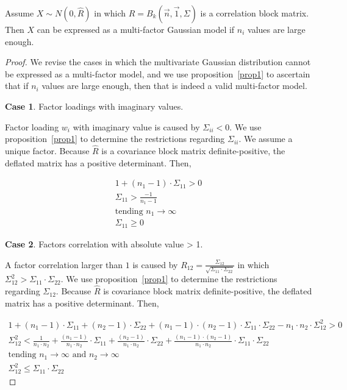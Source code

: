 \documentclass[11pt,fleqn]{book} %
\begin{document}
\begin{proposition}
	\label{prop:gmfamgb}
	Assume $X \sim N(0,\widehat{R})$ in which 
	$\widehat{R}=B_k(\vec{n},\vec{1},\Sigma)$ is a correlation block matrix. 
	Then $X$ can be expressed as a multi-factor Gaussian model if $n_i$ 
	values are large enough.
\end{proposition}
\begin{proof}
	We revise the cases in which the multivariate Gaussian distribution cannot
	be expressed as a multi-factor model, and we use proposition~\ref{prop1}
	to ascertain that if $n_i$ values are large enough, then 
	that is indeed a valid multi-factor model.
	
	\textbf{Case 1}. Factor loadings with imaginary values.
	\begin{adjustwidth}{1cm}{0pt}
		Factor loading $w_i$ with imaginary value is caused by $\Sigma_{ii} < 0$. 
		We use proposition~\ref{prop1} to determine the restrictions regarding 
		$\Sigma_{ii}$. We assume a unique factor.
		Because $\widehat{R}$ is a covariance block matrix definite-positive, 
		the deflated matrix has a positive determinant. Then,
	\end{adjustwidth}
	\begin{displaymath}
		\begin{array}{l}
			1 + (n_1-1) \cdot \Sigma_{11} > 0
			\\
			\Sigma_{11} > \frac{-1}{n_1-1} 
			\\
			\text{tending } n_1 \to \infty
			\\
			\Sigma_{11} \ge 0
		\end{array}
	\end{displaymath}
	
	\textbf{Case 2}. Factors correlation with absolute value > 1.
	\begin{adjustwidth}{1cm}{0pt}
		A factor correlation larger than $1$ is caused by 
		$R_{12} = \frac{\Sigma_{12}}{\sqrt{\Sigma_{11} \cdot \Sigma_{22}}}$
		in which $\Sigma_{12}^2 > \Sigma_{11} \cdot \Sigma_{22}$.
		We use proposition~\ref{prop1} to determine the restrictions regarding 
		$\Sigma_{12}$. Because $\widehat{R}$ is covariance block matrix 
		definite-positive, the deflated matrix has a positive determinant. 
		Then,
	\end{adjustwidth}
	\begin{displaymath}
		\begin{array}{l}
			1 + (n_1-1) \cdot \Sigma_{11} + (n_2-1) \cdot \Sigma_{22} +
			(n_1-1) \cdot (n_2-1) \cdot \Sigma_{11} \cdot \Sigma_{22} -
			n_1 \cdot n_2 \cdot \Sigma_{12}^2 > 0
			\\
			\Sigma_{12}^2 <
			\frac{1}{n_1 \cdot n_2} +
			\frac{(n_1-1)}{n_1 \cdot n_2} \cdot \Sigma_{11} +
			\frac{(n_2-1)}{n_1 \cdot n_2} \cdot \Sigma_{22} +
			\frac{(n_1-1) \cdot (n_2-1)}{n_1 \cdot n_2} \cdot \Sigma_{11} \cdot \Sigma_{22}
			\\
			\text{tending } n_1 \to \infty \text{ and } n_2 \to \infty
			\\
			\Sigma_{12}^2 \le \Sigma_{11} \cdot \Sigma_{22}
		\end{array}
	\end{displaymath}
\end{proof}
\end{document}
